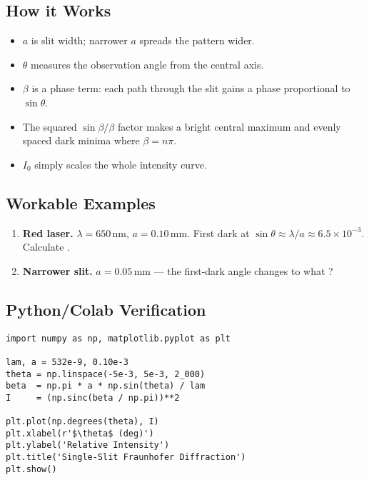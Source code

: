 \documentclass[12pt]{article}
\begin{document}
\subsection*{How it Works}
\begin{itemize}
  \item \(a\) is slit width; narrower \(a\) spreads the pattern wider.
  \item \(\theta\) measures the observation angle from the central axis.
  \item \(\beta\) is a phase term: each path through the slit gains a phase proportional to \(\sin\theta\).
  \item The squared \(\sin\beta/\beta\) factor makes a bright central maximum and evenly spaced dark minima where \(\beta=n\pi\).
  \item \(I_{0}\) simply scales the whole intensity curve.
\end{itemize}

\subsection*{Workable Examples}
\begin{enumerate}
  \item \textbf{Red laser.}  \(\lambda=650\,\text{nm}\), \(a=0.10\,\text{mm}\).  First dark at \(\sin\theta\approx\lambda/a\approx6.5\times10^{-3}\). Calculate \theta.
  \item \textbf{Narrower slit.}  \(a=0.05\,\text{mm}\) — the first-dark angle changes to what \theta?
\end{enumerate}

\subsection*{Python/Colab Verification}
\begin{lstlisting}[caption=Single-slit diffraction,label=lst:slit]
import numpy as np, matplotlib.pyplot as plt

lam, a = 532e-9, 0.10e-3
theta = np.linspace(-5e-3, 5e-3, 2_000)
beta  = np.pi * a * np.sin(theta) / lam
I     = (np.sinc(beta / np.pi))**2

plt.plot(np.degrees(theta), I)
plt.xlabel(r'$\theta$ (deg)')
plt.ylabel('Relative Intensity')
plt.title('Single-Slit Fraunhofer Diffraction')
plt.show()
\end{lstlisting}
\end{document}
